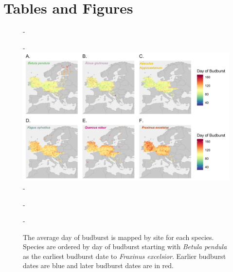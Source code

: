 \documentclass{article}\usepackage[]{graphicx}\usepackage[]{color}
\begin{document}
%




\section*{Tables and Figures} %

{\begin{figure} [H]
  -\begin{center}
  -\includegraphics[width=14cm]{..//figures/BB_dvr.png}
  -\caption{The average day of budburst is mapped by site for each species. Species are ordered by day of budburst starting with \textit{Betula pendula} as the earliest budburst date to \textit{Fraxinus excelsior}. Earlier budburst dates are blue and later budburst dates are in red. }\label{fig:bbmap}
  -\end{center}
  -\end{figure}}
  
\end{document}
